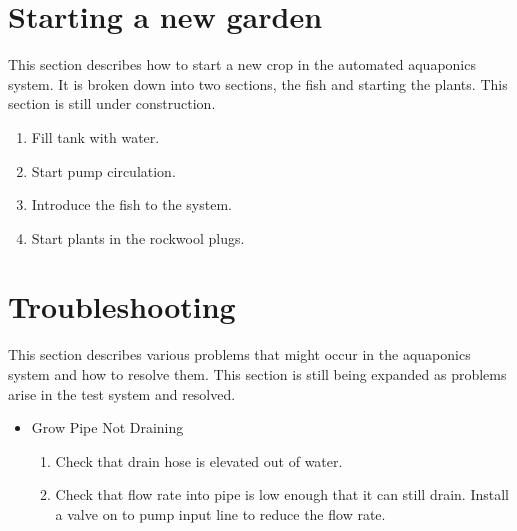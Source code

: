 \documentclass[american,12pt]{article}
\begin{document}
\section{Starting a new garden}
This section describes how to start a new crop in the automated aquaponics
system. It is broken down into two sections, the fish and starting the plants.
This section is still under construction.

\begin{enumerate}
    \item Fill tank with water.
    \item Start pump circulation.
    \item Introduce the fish to the system.
    \item Start plants in the rockwool plugs.
\end{enumerate}

\section{Troubleshooting}
This section describes various problems that might occur in the 
aquaponics system and how to resolve them. This section is still
being expanded as problems arise in the test system and
resolved.

\begin{itemize}
	\item Grow Pipe Not Draining
	\begin{enumerate}
		\item Check that drain hose is elevated out of water.
		\item Check that flow rate into pipe is low enough that it can still 
			drain. Install a valve on to pump input line to reduce the flow 
			rate.
	\end{enumerate}
\end{itemize}

\newpage
\printbibliography
\end{document}
